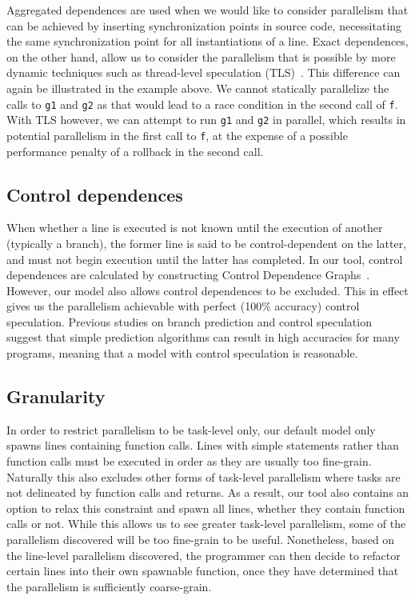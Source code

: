 Aggregated dependences are used when we would like to consider parallelism that can be achieved by inserting synchronization points in source code, necessitating the same synchronization point for all instantiations of a line.
Exact dependences, on the other hand, allow us to consider the parallelism that is possible by more dynamic techniques such as thread-level speculation (TLS)~\cite{Rundberg01anall-software,gregory05stampede,welc05safe}.
This difference can again be illustrated in the example above.
We cannot statically parallelize the calls to \texttt{g1} and \texttt{g2} as that would lead to a race condition in the second call of \texttt{f}.
With TLS however, we can attempt to run \texttt{g1} and \texttt{g2} in parallel, which results in potential parallelism in the first call to \texttt{f}, at the expense of a possible performance penalty of a rollback in the second call.

\subsection{Control dependences}
When whether a line is executed is not known until the execution of another (typically a branch), the former line is said to be control-dependent on the latter, and must not begin execution until the latter has completed.
In our tool, control dependences are calculated by constructing Control Dependence Graphs~\cite{ferrante87program}.
However, our model also allows control dependences to be excluded.
This in effect gives us the parallelism achievable with perfect (100\% accuracy) control speculation.
Previous studies on branch prediction and control speculation~\cite{smith98study,lam92limits} suggest that simple prediction algorithms can result in high accuracies for many programs, meaning that a model with control speculation is reasonable.

\subsection{Granularity}
In order to restrict parallelism to be task-level only, our default model only spawns lines containing function calls.
Lines with simple statements rather than function calls must be executed in order as they are usually too fine-grain.
Naturally this also excludes other forms of task-level parallelism where tasks are not delineated by function calls and returns.
As a result, our tool also contains an option to relax this constraint and spawn all lines, whether they contain function calls or not.
While this allows us to see greater task-level parallelism, some of the parallelism discovered will be too fine-grain to be useful.
Nonetheless, based on the line-level parallelism discovered, the programmer can then decide to refactor certain lines into their own spawnable function, once they have determined that the parallelism is sufficiently coarse-grain.

